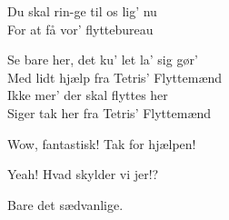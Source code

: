 \documentclass[a4paper,11pt]{article}
\begin{document}
\begin{sketch}
 Du skal rin-ge til os lig' nu \\ For at få vor' flyttebureau

 Se bare her, det ku' let la' sig gør' \\ Med lidt hjælp fra Tetris' Flyttemænd \\ Ikke mer' der skal flyttes her \\ Siger tak her fra Tetris' Flyttemænd


 Wow, fantastisk! Tak for hjælpen!

 Yeah! Hvad skylder vi jer!?

 Bare det sædvanlige.



\end{sketch}
\end{document}
